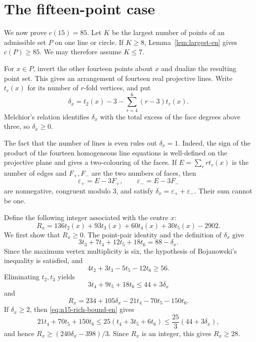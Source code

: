 \documentclass[11pt,a4paper]{article}
\theoremstyle{definition}
\begin{document}
\section{The fifteen-point case}\label{sec:n15-en}

We now prove $c(15)=85$.  Let $K$ be the largest number of points of an
admissible set $P$ on one line or circle.  If $K\ge8$,
Lemma~\ref{lem:largest-en} gives $c(P)\ge85$.  We may therefore assume
$K\le7$.

For $x\in P$, invert the other fourteen points about $x$ and dualize the
resulting point set.  This gives an arrangement of fourteen real projective
lines.  Write $t_r(x)$ for its number of $r$-fold vertices, and put
\[
 \delta_x=t_2(x)-3-\sum_{r=4}^{6}(r-3)t_r(x).
\]
Melchior's relation identifies $\delta_x$ with the total excess of the face
degrees above three, so $\delta_x\ge0$.

The fact that the number of lines is even rules out $\delta_x=1$.  Indeed,
the sign of the product of the fourteen homogeneous line equations is
well-defined on the projective plane and gives a two-colouring of the faces.
If $E=\sum_r r t_r(x)$ is the number of edges and $F_+,F_-$ are the two
numbers of faces, then
\[
 \varepsilon_+=E-3F_+,
 \qquad \varepsilon_-=E-3F_-
\]
are nonnegative, congruent modulo $3$, and satisfy
$\delta_x=\varepsilon_++\varepsilon_-$.  Their sum cannot be one.

Define the following integer associated with the centre $x$:
\begin{equation}\label{eq:n15-residual-en}
 R_x=136t_2(x)+93t_3(x)+60t_4(x)+30t_5(x)-2902.
\end{equation}
We first show that $R_x\ge0$.  The point-pair identity and the definition of
$\delta_x$ give
\[
 3t_3+7t_4+12t_5+18t_6=88-\delta_x.
\]
Since the maximum vertex multiplicity is six, the hypothesis of Bojanowski's
inequality is satisfied, and
\[
 4t_2+3t_3-5t_5-12t_6\ge56.
\]
Eliminating $t_2,t_3$ yields
\begin{equation}\label{eq:n15-rich-bound-en}
 3t_4+9t_5+18t_6\le44+3\delta_x
\end{equation}
and
\begin{equation}\label{eq:n15-residual-delta-en}
 R_x=234+105\delta_x-21t_4-70t_5-150t_6.
\end{equation}
If $\delta_x\ge2$, then \eqref{eq:n15-rich-bound-en} gives
\[
21t_4+70t_5+150t_6
 \le25(t_4+3t_5+6t_6)
 \le\frac{25}{3}(44+3\delta_x),
\]
and hence $R_x\ge(240\delta_x-398)/3$.  Since $R_x$ is an integer,
this gives $R_x\ge28$.
\end{document}
